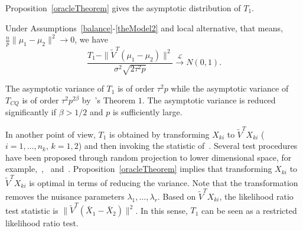 
Proposition~\ref{oracleTheorem} gives the asymptotic distribution of $T_1$.

\begin{proposition}\label{oracleTheorem}
    Under Assumptions~\ref{balance}-\ref{theModel2} and local alternative, that means, $\frac{n}{p}\|\mu_1-\mu_2\|^2\to 0$, we have 
    \begin{equation*}
        \frac{T_1-\|\tilde{V}^T(\mu_1-\mu_2)\|^2}
        {\sigma^2\sqrt{2\tau^2 p}}\xrightarrow{\mathcal{L}}N(0,1).
    \end{equation*}
\end{proposition}

\begin{remark}
    The asymptotic variance of $T_1$ is of order $\tau^2 p$ while the asymptotic variance of $T_{CQ}$ is of order $\tau^2 p^{2\beta}$ by~\cite{Chen2010A}'s Theorem $1$.
    The asymptotic variance is reduced significantly if $\beta>1/2$ and $p$ is sufficiently large.
\end{remark}


In another point of view,
$T_1$ is obtained by transforming $X_{ki}$ to $\tilde{V}^T X_{ki}$ ($i=1,\ldots, n_k$, $k=1,2$) and then invoking the statistic of~\cite{Chen2010A}.
Several test procedures have been proposed through random projection to lower dimensional space, for example,~\cite{Lopes2015A},~\cite{Thulin2014A} and~\cite{Srivastava2014RAPTT}.
Proposition~\ref{oracleTheorem} implies that transforming $X_{ki}$ to $\tilde{V}^T X_{ki}$ is optimal in terms of reducing the variance. Note that the transformation removes the nuisance parameters $\lambda_1,\ldots,\lambda_r$. Based on $\tilde{V}^T X_{ki}$, the likelihood ratio test statistic is
    $\|\tilde{V}^T (\bar{X}_1-\bar{X}_2)\|^2$. In this sense, $T_1$ can be seen as a restricted likelihood ratio test.



